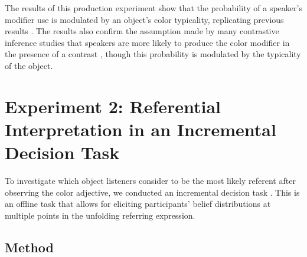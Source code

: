 \documentclass[10pt,letterpaper]{article}
\begin{document}
The results of this production experiment show that the probability of a speaker's modifier use is modulated by an object's color typicality, replicating previous results \cite{Westerbeek:2015}. The results also confirm the assumption made by many contrastive inference studies that speakers are more likely to produce the color modifier in the presence of a contrast \cite{Aparicio:2018,Grodner:2011,Sedivy:1999}, though this probability is modulated by the typicality of the object.


\section{Experiment 2: Referential Interpretation in an Incremental Decision Task}

To investigate which object listeners consider to be the most likely referent after observing the color adjective, we conducted an incremental decision task \cite{Qing:2018}. This is an offline task that allows for eliciting participants' belief distributions at multiple points in the unfolding referring expression. 

\subsection{Method}



\end{document}
